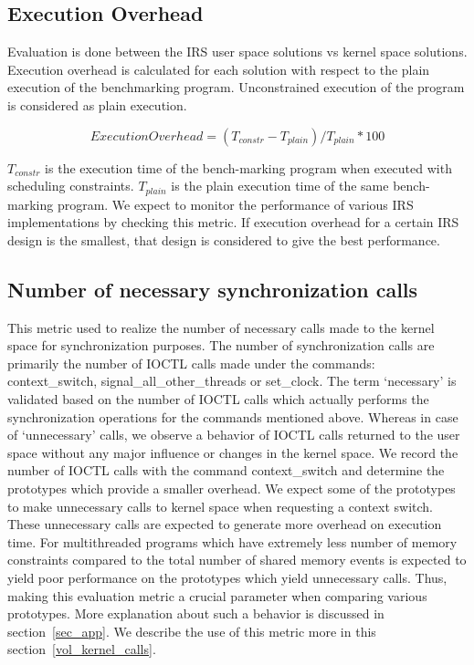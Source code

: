 \subsection{Execution Overhead}

Evaluation is done between the IRS user space solutions vs kernel space solutions. 
Execution overhead is calculated for each solution with respect to the plain execution of the benchmarking program. 
Unconstrained execution of the program is considered as plain execution. 

$$Execution Overhead = (T_{constr} - T_{plain})/T_{plain} * 100$$

$T_{constr}$ is the execution time of the bench-marking program when executed with scheduling constraints. 
$T_{plain}$ is the plain execution time of the same bench-marking program. 
We expect to monitor the performance of various IRS implementations by checking this metric. 
If execution overhead for a certain IRS design is the smallest, that design is considered to give the best performance. 

\subsection{Number of necessary synchronization calls} 

This metric used to realize the number of necessary calls made to the kernel space for synchronization purposes. 
The number of synchronization calls are primarily the number of IOCTL calls made under the commands: context\_switch, signal\_all\_other\_threads or set\_clock. 
The term `necessary' is validated based on the number of IOCTL calls which actually performs the synchronization operations for the commands mentioned above. 
Whereas in case of `unnecessary' calls, we observe a behavior of IOCTL calls returned to the user space without any major influence or changes in the kernel space. 
We record the number of IOCTL calls with the command context\_switch and determine the prototypes which provide a smaller overhead. 
We expect some of the prototypes to make unnecessary calls to kernel space when requesting a context switch. 
These unnecessary calls are expected to generate more overhead on execution time. 
For multithreaded programs which have extremely less number of memory constraints compared to the total number of shared memory events is expected to yield poor performance on the prototypes which yield unnecessary calls. 
Thus, making this evaluation metric a crucial parameter when comparing various prototypes. 
More explanation about such a behavior is discussed in section~\ref{sec_app}.  
We describe the use of this metric more in this section~\ref{vol_kernel_calls}.  


